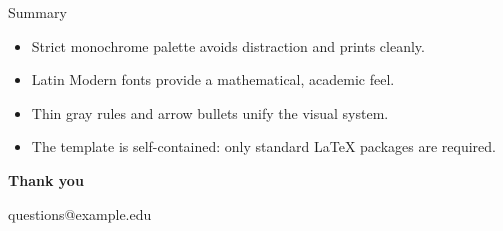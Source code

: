 \documentclass[aspectratio=169,10pt]{beamer}
\begin{document}
\begin{frame}{Summary}
  \begin{itemize}
    \item Strict monochrome palette avoids distraction and prints cleanly.
    \item Latin Modern fonts provide a mathematical, academic feel.
    \item Thin gray rules and arrow bullets unify the visual system.
    \item The template is self-contained: only standard LaTeX packages are required.
  \end{itemize}
  \vspace{0.6cm}
  \begin{center}
    {\Large\bfseries Thank you}\par
    \vspace{0.3cm}
    {\small\color{bfgray} questions@example.edu}
  \end{center}
\end{frame}
\end{document}
